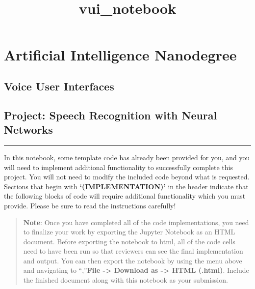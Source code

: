 \documentclass[11pt]{article}
\title{vui\_notebook}
\begin{document}
    
    
    \maketitle
    
    

    
    \hypertarget{artificial-intelligence-nanodegree}{%
\section{Artificial Intelligence
Nanodegree}\label{artificial-intelligence-nanodegree}}

\hypertarget{voice-user-interfaces}{%
\subsection{Voice User Interfaces}\label{voice-user-interfaces}}

\hypertarget{project-speech-recognition-with-neural-networks}{%
\subsection{Project: Speech Recognition with Neural
Networks}\label{project-speech-recognition-with-neural-networks}}

\begin{center}\rule{0.5\linewidth}{\linethickness}\end{center}

In this notebook, some template code has already been provided for you,
and you will need to implement additional functionality to successfully
complete this project. You will not need to modify the included code
beyond what is requested. Sections that begin with
\textbf{`(IMPLEMENTATION)'} in the header indicate that the following
blocks of code will require additional functionality which you must
provide. Please be sure to read the instructions carefully!

\begin{quote}
\textbf{Note}: Once you have completed all of the code implementations,
you need to finalize your work by exporting the Jupyter Notebook as an
HTML document. Before exporting the notebook to html, all of the code
cells need to have been run so that reviewers can see the final
implementation and output. You can then export the notebook by using the
menu above and navigating to \n``,''\textbf{File -\textgreater{}
Download as -\textgreater{} HTML (.html)}. Include the finished document
along with this notebook as your submission.
\end{quote}
\end{document}
